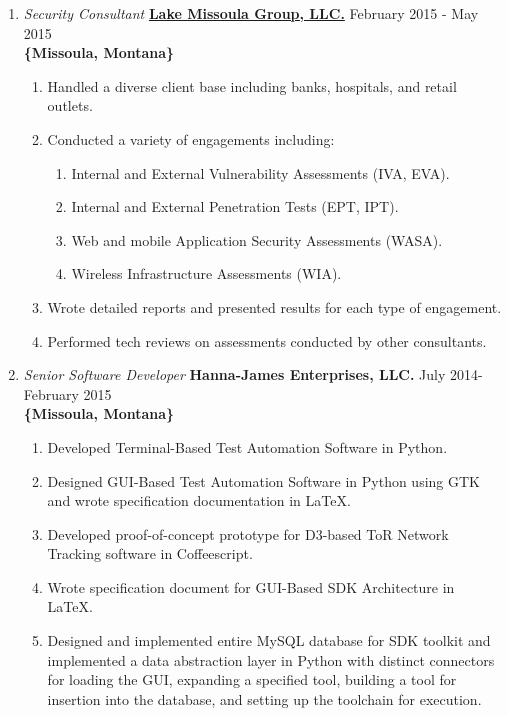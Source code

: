 \documentclass[oneside]{article}%
\begin{document}
\begin{enumerate}[]
	\item \textit{Security Consultant} \textbf{\href{https://lmgsecurity.com/}{Lake Missoula Group, LLC.}} \hfill February 2015 - May 2015\\
		\textbf{\{Missoula, Montana\}}
		\begin{enumerate}[*]
			\item Handled a diverse client base including banks, hospitals, and retail outlets.
			\item Conducted a variety of engagements including:
				\begin{enumerate}[.]
					\item Internal and External Vulnerability Assessments (IVA, EVA).
					\item Internal and External Penetration Tests (EPT, IPT).					
					\item Web and mobile Application Security Assessments (WASA).
					\item Wireless Infrastructure Assessments (WIA).
				\end{enumerate}
			\item Wrote detailed reports and presented results for each type of engagement.
			\item Performed tech reviews on assessments conducted by other consultants.
		\end{enumerate}
	\item \textit{Senior Software Developer} \textbf{Hanna-James Enterprises, LLC.} \hfill July 2014-February 2015\\
		\textbf{\{Missoula, Montana\}}
		\begin{enumerate}[*]
			\item Developed Terminal-Based Test Automation Software in Python.
			\item Designed GUI-Based Test Automation Software in Python using GTK and wrote specification documentation in \LaTeX.
			\item Developed proof-of-concept prototype for D3-based ToR Network Tracking software in Coffeescript.
			\item Wrote specification document for GUI-Based SDK Architecture in \LaTeX.
			\item Designed and implemented entire MySQL database for SDK toolkit and implemented a data abstraction layer in Python with distinct connectors for loading the GUI, expanding a specified tool, building a tool for insertion into the database, and setting up the toolchain for execution.
		\end{enumerate}
\end{enumerate}
\end{document}
